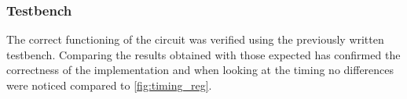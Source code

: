\pagebreak
\subsubsection{Testbench}
The correct functioning of the circuit was verified using the previously written testbench. Comparing the results obtained with those expected has confirmed the correctness of the implementation and when looking at the timing no differences were noticed compared to \autoref{fig:timing_reg}.
\pagebreak